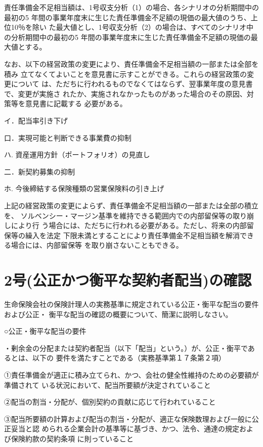 \documentclass[report,gutter=10mm,fore-edge=10mm,uplatex,dvipdfmx]{jlreq}
\begin{document}
責任準備金不足相当額は、1号収支分析（1）の場合、各シナリオの分析期間中の最初の5
年間の事業年度末に生じた責任準備金不足額の現価の最大値のうち、上位10％を除い
た最大値とし、1号収支分析（2）の場合は、すべてのシナリオ中の分析期間中の最初の5
年間の事業年度末に生じた責任準備金不足額の現価の最大値とする。

なお、以下の経営政策の変更により、責任準備金不足相当額の一部または全部を積み
立てなくてよいことを意見書に示すことができる。これらの経営政策の変更について
は、ただちに行われるものでなくてはならず、翌事業年度の意見書で、変更が実施さ
れたか、実施されなかったものがあった場合のその原因、対策等を意見書に記載する
必要がある。

イ．配当率引き下げ

口．実現可能と判断できる事業費の抑制

ハ. 資産運用方針（ポートフォリオ）の見直し

二．新契約募集の抑制

ホ. 今後締結する保険種類の営業保険料の引き上げ

上記の経営政策の変更によらず、責任準備金不足相当額の一部または全部の積立を、
ソルベンシー・マージン基準を維持できる範囲内での内部留保等の取り崩しにより行
う場合には、ただちに行われる必要がある。ただし、将来の内部留保等の繰入を法定
下限未満とすることにより責任準備金不足相当額を解消できる場合には、内部留保等
を取り崩さないこともできる。


\section{2号(公正かつ衡平な契約者配当)の確認}

生命保険会社の保険計理人の実務基準に規定されている公正・衡平な配当の要件および公正・
衡平な配当の確認の概要について、簡潔に説明しなさい。

\answer{}
○公正・衡平な配当の要件

・剰余金の分配または契約者配当（以下「配当」という。）が、公正・衡平であるとは、以下の
要件を満たすことである（実務基準第１７条第２項）

①責任準備金が適正に積み立てられ、かつ、会社の健全性維持のための必要額が準備されて
いる状況において、配当所要額が決定されていること

②配当の割当・分配が、個別契約の貢献に応じて行われていること

③配当所要額の計算および配当の割当・分配が、適正な保険数理および一般に公正妥当と認
められる企業会計の基準等に基づき、かつ、法令、通達の規定および保険約款の契約条項
に則っていること
\end{document}
